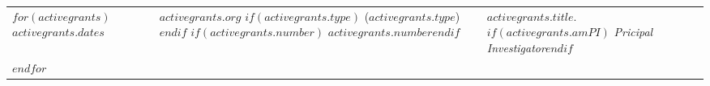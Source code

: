 \documentclass[martgin, line, 10pt]{article}
\begin{document}
\setlength{\extrarowheight}{.5em}
\begin{longtable}[l]{lp{2.5in}p{4.5in}}
  $for(activegrants)$
  $activegrants.dates$&
  \parbox[t]{2.25in} {
  $activegrants.org$
  $if(activegrants.type)$
  ($activegrants.type$)
  $endif$
  $if(activegrants.number)$\\$activegrants.number$$endif$}&
  \parbox[t]{3in}{$activegrants.title$.
  $if(activegrants.amPI)$ \textit{Pricipal Investigator}$endif$}\\
  $endfor$
  
\end{longtable}
\setlength{\extrarowheight}{.0em}
\end{document}
